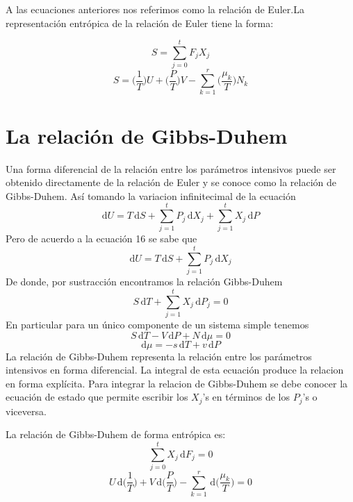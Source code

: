 \documentclass[10pt,twocolumn]{IEEEtran2e}
\newcommand{\ud}{\mathrm{d}}
\begin{document}
A las ecuaciones anteriores nos referimos como la relaci\'on de Euler.La representaci\'on entr\'opica de la relaci\'on de Euler tiene la forma:

\begin{equation}
 S=\sum_{j=0}^{t}F_{j}X_{j}
\end{equation}
\begin{equation}
 S=\bigg(\frac{1}{T}\bigg)U+\bigg(\frac{P}{T}\bigg)V-\sum_{k=1}^{r}\bigg(\frac{\mu_{k}}{T}\bigg)N_{k}
\end{equation}

\section{La relaci\'on de Gibbs-Duhem}
Una forma diferencial de la relaci\'on entre los par\'ametros intensivos puede ser obtenido directamente de la relaci\'on de Euler y se conoce como la relaci\'on de Gibbs-Duhem. As\'i tomando la variacion infinitecimal de la ecuaci\'on
\begin{equation}
 \ud U = T\, \ud S + \sum_{j=1}^{t}P_{j}\, \ud X_{j} + \sum_{j=1}^{t}X_{j}\,\ud P
\end{equation}
Pero de acuerdo a la ecuaci\'on 16 se sabe que
\begin{equation}
 \ud U=T\,\ud S + \sum_{j=1}^{t}P_{j}\,\ud X_{j}
\end{equation}
De donde, por sustracci\'on encontramos la relaci\'on Gibbs-Duhem
\begin{equation}
 S\,\ud T+\sum_{j=1}^{t}X_{j}\,\ud P_{j}=0
\end{equation}
En particular para un \'unico componente de un sistema simple tenemos
\begin{equation}
 S\,\ud T-V\,\ud P + N\,\ud \mu=0
\end{equation}
\begin{equation}
 \ud \mu = -s\,\ud T + v\,\ud P
\end{equation}
La relaci\'on de Gibbs-Duhem representa la relaci\'on entre los par\'ametros intensivos en forma diferencial.
La integral de esta ecuaci\'on produce la relacion en forma expl\'icita. Para integrar la relacion de Gibbs-Duhem se debe conocer la ecuaci\'on de estado que permite escribir los $X_{j}$'s en t\'erminos de los $P_{j}$'s o viceversa.

La relaci\'on de Gibbs-Duhem de forma entr\'opica es:
\begin{equation}
 \sum_{j=0}^{t}X_{j}\,\ud F_{j}=0
\end{equation}
\begin{equation}
 U\,\ud \bigg(\frac{1}{T}\bigg)+V\,\ud\bigg(\frac{P}{T}\bigg)-\sum_{k=1}^{r}\,\ud\bigg(\frac{\mu_{k}}{T}\bigg)=0
\end{equation}
\end{document}
